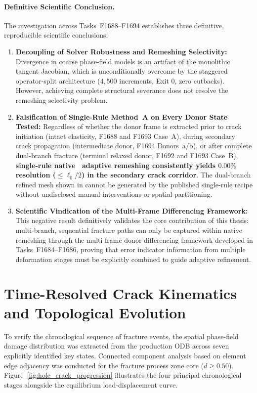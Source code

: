 \paragraph{Definitive Scientific Conclusion.}
The investigation across Tasks~F1688--F1694 establishes three definitive, reproducible scientific conclusions:
\begin{enumerate}
  \item \textbf{Decoupling of Solver Robustness and Remeshing Selectivity:} Divergence in coarse phase-field models is an artifact of the monolithic tangent Jacobian, which is unconditionally overcome by the staggered operator-split architecture ($4{,}500$ increments, Exit 0, zero cutbacks). However, achieving complete structural severance does not resolve the remeshing selectivity problem.
  \item \textbf{Falsification of Single-Rule Method~A on Every Donor State Tested:} Regardless of whether the donor frame is extracted prior to crack initiation (intact elasticity, F1688 and F1693 Case~A), during secondary crack propagation (intermediate donor, F1694 Donors~a/b), or after complete dual-branch fracture (terminal relaxed donor, F1692 and F1693 Case~B), \textbf{single-rule native \MISESERI\ adaptive remeshing consistently yields $0.00\%$ resolution ($\le \ell_0/2$) in the secondary crack corridor}. The dual-branch refined mesh shown in \citet[Fig.~16b]{pandey2025} cannot be generated by the published single-rule recipe without undisclosed manual interventions or spatial partitioning.
  \item \textbf{Scientific Vindication of the Multi-Frame Differencing Framework:} This negative result definitively validates the core contribution of this thesis: multi-branch, sequential fracture paths can only be captured within native \Abaqus remeshing through the multi-frame donor differencing framework developed in Tasks~F1684--F1686, proving that error indicator information from multiple deformation stages must be explicitly combined to guide adaptive refinement.
\end{enumerate}

\section{Time-Resolved Crack Kinematics and Topological Evolution}
\label{sec:hole_time_resolved_crack}

To verify the chronological sequence of fracture events, the spatial phase-field damage distribution was extracted from the production ODB across seven explicitly identified key states. Connected component analysis based on element edge adjacency was conducted for the fracture process zone core ($d \ge 0.50$). Figure~\ref{fig:hole_crack_progression} illustrates the four principal chronological stages alongside the equilibrium load-displacement curve.

